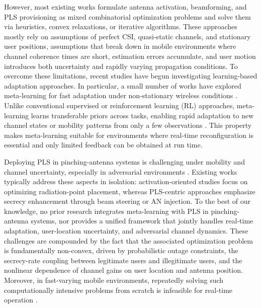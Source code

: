 \documentclass[journal,10pt]{IEEEtran}
\begin{document}
However, most existing works formulate antenna activation, beamforming, and PLS provisioning as mixed combinatorial optimization problems and solve them via heuristics, convex relaxations, or iterative algorithms. These approaches mostly rely on assumptions of perfect CSI, quasi-static channels, and stationary user positions, assumptions that break down in mobile environments where channel coherence times are short, estimation errors accumulate, and user motion introduces both uncertainty and rapidly varying propagation conditions. To overcome these limitations, recent studies have begun investigating learning-based adaptation approaches. In particular, a small number of works have explored meta-learning for fast adaptation under non-stationary wireless conditions \cite{zhou2025gradient, amhaz2025coordinated, Zhang2024}. Unlike conventional supervised or reinforcement learning (RL) approaches, meta-learning learns transferable priors across tasks, enabling rapid adaptation to new channel states or mobility patterns from only a few observations \cite{frikha2021few, Hospedales2022}. This property makes meta-learning suitable for environments where real-time reconfiguration is essential and only limited feedback can be obtained at run time.


Deploying PLS in pinching-antenna systems is challenging under mobility and channel uncertainty, especially in adversarial environments \cite{Hayder2017}. Existing works typically address these aspects in isolation: activation-oriented studies focus on optimizing radiation-point placement, whereas PLS-centric approaches emphasize secrecy enhancement through beam steering or AN injection. To the best of our knowledge, no prior research integrates meta-learning with PLS in pinching-antenna systems, nor provides a unified framework that jointly handles real-time adaptation, user-location uncertainty, and adversarial channel dynamics.
These challenges are compounded by the fact that the associated optimization problem is fundamentally non-convex, driven by probabilistic outage constraints, the secrecy-rate coupling between legitimate users and illegitimate users, and the nonlinear dependence of channel gains on user location and antenna position. Moreover, in fast-varying mobile environments, repeatedly solving such computationally intensive problems from scratch is infeasible for real-time operation \cite{8227766}.
\end{document}
